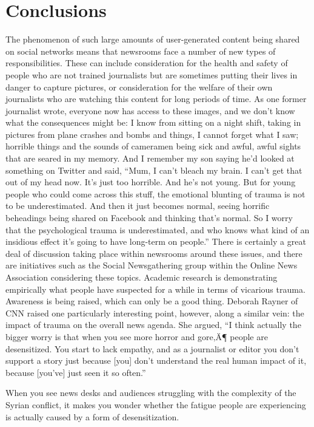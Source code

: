 \documentclass[symmetric, notoc, nobib]{towcenter-book}
\begin{document}
\section{Conclusions}
The phenomenon of such large amounts of user-generated content being
shared on social networks means that newsrooms face a number of new
types of responsibilities. These can include consideration for the health and
safety of people who are not trained journalists but are sometimes putting
their lives in danger to capture pictures, or consideration for the welfare of
their own journalists who are watching this content for long periods of time.
As one former journalist wrote, everyone now has access to these images,
and we don't know what the consequences might be:
I know from sitting on a night shift, taking in pictures from plane
crashes and bombs and things, I cannot forget what I saw; horrible
things and the sounds of cameramen being sick and awful, awful
sights that are seared in my memory. And I remember my son saying
he'd looked at something on Twitter and said, ``Mum, I can't bleach
my brain. I can't get that out of my head now. It's just too horrible.
And he's not young. But for young people who could come across
this stuff, the emotional blunting of trauma is not to be underestimated.
And then it just becomes normal, seeing horrific beheadings
being shared on Facebook and thinking that's normal. So I worry that
the psychological trauma is underestimated, and who knows what
kind of an insidious effect it's going to have long-term on people.''
There is certainly a great deal of discussion taking place within newsrooms
around these issues, and there are initiatives such as the Social Newsgathering
group within the Online News Association considering these topics.
Academic research is demonstrating empirically what people have suspected
for a while in terms of vicarious trauma. Awareness is being raised,
which can only be a good thing.
Deborah Rayner of CNN raised one particularly interesting point, however,
along a similar vein: the impact of trauma on the overall news agenda. She
argued, ``I think actually the bigger worry is that when you see more horror
and gore‚Ä¶ people are desensitized. You start to lack empathy, and as a
journalist or editor you don't support a story just because [you] don't understand
the real human impact of it, because [you've] just seen it so often.''

When you see news desks and audiences struggling with the complexity
of the Syrian conflict, it makes you wonder whether the fatigue people are
experiencing is actually caused by a form of desensitization.
\end{document}
